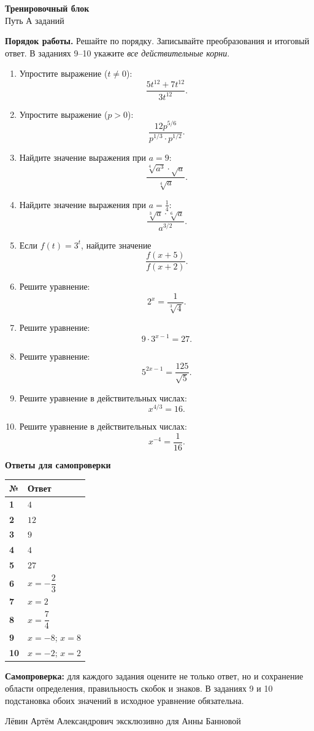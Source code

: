 \documentclass[a4paper,12pt]{article}
\newcommand{\important}[1]{\textbf{\color{darkaccent}#1}}
\begin{document}
\clearpage
\begin{center}
{\LARGE\bfseries\color{darkaccent}Тренировочный блок}\\[3mm]
{\normalsize Путь А \quad\textcolor{accent}{\textbullet} заданий}
\end{center}
\vspace{4mm}
\textbf{Порядок работы.} Решайте по порядку. Записывайте преобразования и итоговый ответ. В заданиях 9--10 укажите \emph{все действительные корни}.
\begin{enumerate}[label=\textbf{\arabic*.}]
\item Упростите выражение ($t\neq0$):
\[ \frac{5t^{12}+7t^{12}}{3t^{12}}. \]
\item Упростите выражение ($p>0$):
\[ \frac{12p^{5/6}}{p^{1/3}\cdot p^{1/2}}. \]
\item Найдите значение выражения при $a=9$:
\[ \frac{\sqrt[4]{a^3}\cdot\sqrt{a}}{\sqrt[4]{a}}. \]
\item Найдите значение выражения при $a=\frac14$:
\[ \frac{\sqrt[3]{a}\cdot\sqrt[6]{a}}{a^{3/2}}. \]
\item Если $f(t)=3^t$, найдите значение
\[ \frac{f(x+5)}{f(x+2)}. \]
\item Решите уравнение:
\[ 2^x=\frac{1}{\sqrt[3]{4}}. \]
\item Решите уравнение:
\[ 9\cdot3^{x-1}=27. \]
\item Решите уравнение:
\[ 5^{2x-1}=\frac{125}{\sqrt5}. \]
\item Решите уравнение в действительных числах:
\[ x^{4/3}=16. \]
\item Решите уравнение в действительных числах:
\[ x^{-4}=\frac1{16}. \]
\end{enumerate}
\clearpage
\begin{center}
{\LARGE\bfseries\color{darkaccent}Ответы для самопроверки}\\[4mm]
\end{center}
\renewcommand{\arraystretch}{1.6}
\begin{center}
\begin{tabularx}{\linewidth}{@{}>{\bfseries}p{15mm}X@{}}
\toprule
№ & Ответ \\
\midrule
1 & $4$ \\
2 & $12$ \\
3 & $9$ \\
4 & $4$ \\
5 & $27$ \\
6 & $x=-\dfrac23$ \\
7 & $x=2$ \\
8 & $x=\dfrac74$ \\
9 & $x=-8$; $x=8$ \\
10 & $x=-2$; $x=2$ \\
\bottomrule
\end{tabularx}
\end{center}
\vspace{9mm}
\important{Самопроверка:} для каждого задания оцените не только ответ, но и сохранение области определения, правильность скобок и знаков. В заданиях 9 и 10 подстановка обоих значений в исходное уравнение обязательна.
\vfill
\begin{center}
\small\color{darkaccent}Лёвин Артём Александрович эксклюзивно для Анны Банновой
\end{center}
\end{document}
